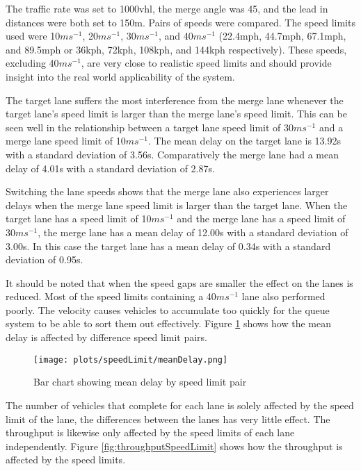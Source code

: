 The traffic rate was set to 1000\si{vhl}, the merge angle was 45\degree, and the lead in distances were both set to 150\si{m}. Pairs of speeds were compared. The speed limits used were 10$\si{ms^{-1}}$, 20$\si{ms^{-1}}$, 30$\si{ms^{-1}}$, and 40$\si{ms^{-1}}$ (22.4\si{mph}, 44.7\si{mph}, 67.1\si{mph}, and 89.5\si{mph} or 36\si{kph}, 72\si{kph}, 108\si{kph}, and 144\si{kph} respectively). These speeds, excluding 40$\si{ms^{-1}}$, are very close to realistic speed limits and should provide insight into the real world applicability of the system.

The target lane suffers the most interference from the merge lane whenever the target lane's speed limit is larger than the merge lane's speed limit. This can be seen well in the relationship between a target lane speed limit of 30$\si{ms^{-1}}$ and a merge lane speed limit of 10$\si{ms^{-1}}$. The mean delay on the target lane is 13.92\si{s} with a standard deviation of 3.56\si{s}. Comparatively the merge lane had a mean delay of 4.01\si{s} with a standard deviation of 2.87\si{s}. 

Switching the lane speeds shows that the merge lane also experiences larger delays when the merge lane speed limit is larger than the target lane. When the target lane has a speed limit of 10$\si{ms^{-1}}$ and the merge lane has a speed limit of 30$\si{ms^{-1}}$, the merge lane has a mean delay of 12.00\si{s} with a standard deviation of 3.00\si{s}. In this case the target lane has a mean delay of 0.34\si{s} with a standard deviation of 0.95\si{s}.

It should be noted that when the speed gaps are smaller the effect on the lanes is reduced. Most of the speed limits containing a 40$\si{ms^{-1}}$ lane also performed poorly. The velocity causes vehicles to accumulate too quickly for the queue system to be able to sort them out effectively. Figure \ref{fig:meanDelaySpeedLimit} shows how the mean delay is affected by difference speed limit pairs.

\begin{figure}[p]
\centerline{
	\texttt{[image: plots/speedLimit/meanDelay.png]}
}
\caption{Bar chart showing mean delay by speed limit pair}
\label{fig:meanDelaySpeedLimit}
\end{figure}

The number of vehicles that complete for each lane is solely affected by the speed limit of the lane, the differences between the lanes has very little effect. The throughput is likewise only affected by the speed limits of each lane independently. Figure \ref{fig:throughputSpeedLimit} shows how the throughput is affected by the speed limits.

